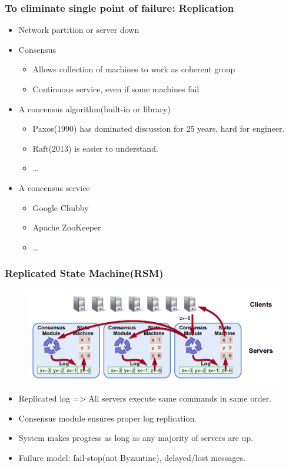 \begin{frame}
    \frametitle{To eliminate single point of failure: Replication}
    \begin{itemize}
        \item Network partition or server down
        \item Consensus
            \begin{itemize}
                \item Allows collection of machines to work as coherent group
                \item Continuous service, even if some machines fail
            \end{itemize}
        \item A concensus algorithm(built-in or library)
            \begin{itemize}
                \item Paxos(1990) has dominated discussion for 25 years, hard for engineer.
                \item Raft(2013) is easier to understand.
                \item \ldots
            \end{itemize}
        \item A concensus service
            \begin{itemize}
                \item Google Chubby
                \item Apache ZooKeeper
                \item \ldots
            \end{itemize}
    \end{itemize}
\end{frame}

\begin{frame}
    \frametitle{Replicated State Machine(RSM)}
    \begin{figure}
       \centering
        \includegraphics[scale=0.3]{./figures/rsm.png}
    \end{figure}

    \begin{itemize}
        \item Replicated log => \alert{All servers execute same commands in same order}.
        \item Consensus module ensures proper log replication.
        \item System makes progress as long as any majority of servers are up.
        \item Failure model: fail-stop(not Byzantine), delayed/lost messages.
    \end{itemize}
\end{frame}


%
